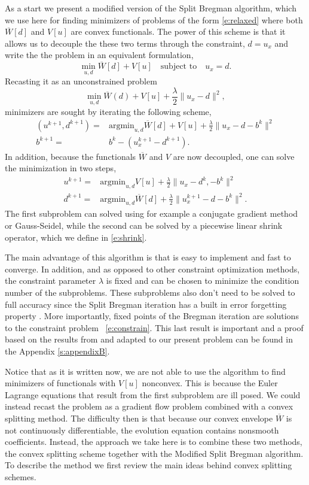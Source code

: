 \documentclass[11pt]{article}
\theoremstyle{plain}
\begin{document}
 As a start we present a modified version of the Split Bregman algorithm, which we use here for finding minimizers of problems of the form \eqref{e:relaxed} where both $\overline{W}[d]$ and $V[u]$ are convex functionals. The power of this scheme is that it allows us to decouple the these two terms through the constraint, $d= u_x$ and write the the problem in an equivalent formulation,
\begin{equation}\label{e:constrain}
 \min_{u,d}  \overline{W}[d] + V[u] \quad \mbox{subject to} \quad u_x = d.
 \end{equation}
 Recasting it as an unconstrained problem 
\[ \min_{u,d}   \overline{W}(d) + V[u] + \frac{\lambda}{2} \| u_x - d\|^2,\]
 minimizers are sought by iterating the following scheme,
\begin{align*}
(u^{k+1},d^{k+1}) =& \mbox{argmin}_{u,d} \overline{W}[d] + V[u] + \frac{\lambda}{2} \| u_x - d -b^k\|^2\\
b^{k+1} = & b^k - (u_x^{k+1} - d^{k+1}).
\end{align*}
In addition, because the functionals $\overline{W}$ and $V$ are now decoupled, one can solve the minimization in two steps,
\begin{align*}
u^{k+1}  =& \mbox{argmin}_{u,d}  V[u] + \frac{\lambda}{2} \| u_x - d^k, -b^k\|^2\\
d^{k+1} =& \mbox{argmin}_{u,d} \overline{W}[d] + \frac{\lambda}{2} \| u_x^{k+1} - d -b^k\|^2.
\end{align*}
The first subproblem can solved using for example a conjugate gradient method or Gauss-Seidel, while the second can be solved by a piecewise linear shrink operator, which we define in \eqref{e:shrink}.

  The main advantage of this algorithm is that is easy to implement and fast to converge. In addition, and as opposed to other constraint optimization methods,  the constraint parameter $\lambda$ is fixed and can be chosen to minimize the condition number of the subproblems. These subproblems also don't need to be solved to full accuracy since the Split Bregman iteration has a built in error forgetting property \cite{yin2013}. More importantly, fixed points of the Bregman iteration are solutions to the constraint problem ~\eqref{e:constrain}. This last result is important and a proof based on the results from  \cite{osher2005} and adapted to our present problem can be found in the Appendix \ref{s:appendixB}.


Notice that as it is written now, we are not able to use the algorithm to find minimizers of functionals with $V[u]$ nonconvex. This is because the Euler Lagrange equations that result from the first subproblem are ill posed.  We could instead recast the problem as a gradient flow problem combined with a convex splitting method.  The difficulty then is that because our convex envelope $\overline{W}$ is not continuously differentiable, the evolution equation contains nonsmooth coefficients. Instead, the approach we take here is to combine these two methods, the convex splitting scheme together with the Modified Split Bregman algorithm. To describe the method we first review the main ideas behind convex splitting schemes.
\end{document}
